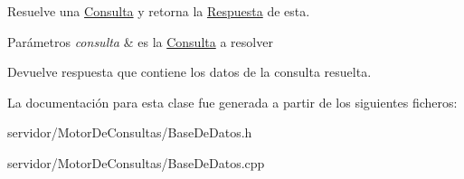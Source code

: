 \-Resuelve una \hyperlink{classConsulta}{\-Consulta} y retorna la \hyperlink{classRespuesta}{\-Respuesta} de esta. 


\begin{DoxyParams}{\-Parámetros}
{\em consulta} & es la \hyperlink{classConsulta}{\-Consulta} a resolver \\
\hline
\end{DoxyParams}
\begin{DoxyReturn}{\-Devuelve}
respuesta que contiene los datos de la consulta resuelta. 
\end{DoxyReturn}


\-La documentación para esta clase fue generada a partir de los siguientes ficheros\-:\begin{DoxyCompactItemize}
\item 
servidor/\-Motor\-De\-Consultas/\-Base\-De\-Datos.\-h\item 
servidor/\-Motor\-De\-Consultas/\-Base\-De\-Datos.\-cpp\end{DoxyCompactItemize}
